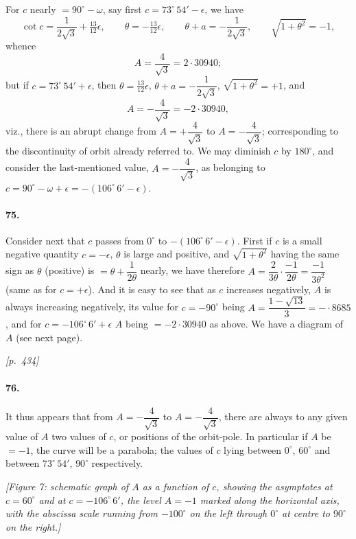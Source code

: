 \documentclass[11pt]{article}
\begin{document}
For $c$ nearly $= 90^{\circ}-\omega$, say first $c = 73^{\circ}\,54' - \epsilon$, we have
\[
\cot c = \dfrac{1}{2\sqrt{3}} + \tfrac{13}{12}\epsilon,\qquad \theta = -\tfrac{13}{12}\epsilon,\qquad \theta + a = -\dfrac{1}{2\sqrt{3}},\qquad \sqrt{1 + \theta^{2}} = -1,
\]
whence
\[
A = \dfrac{4}{\sqrt{3}} = 2{\cdot}30940;
\]
but if $c = 73^{\circ}\,54' + \epsilon$, then $\theta = \tfrac{13}{12}\epsilon$, $\theta + a = -\dfrac{1}{2\sqrt{3}}$, $\sqrt{1 + \theta^{2}} = +1$, and
\[
A = -\dfrac{4}{\sqrt{3}} = -2{\cdot}30940,
\]
viz., there is an abrupt change from $A = +\dfrac{4}{\sqrt{3}}$ to $A = -\dfrac{4}{\sqrt{3}}$; corresponding to the discontinuity of orbit already referred to. We may diminish $c$ by $180^{\circ}$, and consider the last-mentioned value, $A = -\dfrac{4}{\sqrt{3}}$, as belonging to $c = 90^{\circ} - \omega + \epsilon = -(106^{\circ}\,6' - \epsilon)$.

\paragraph{75.} Consider next that $c$ passes from $0^{\circ}$ to $-(106^{\circ}\,6' - \epsilon)$. First if $c$ is a small negative quantity $c = -\epsilon$, $\theta$ is large and positive, and $\sqrt{1 + \theta^{2}}$ having the same sign as $\theta$ (positive) is $=\theta + \dfrac{1}{2\theta}$ nearly, we have therefore $A = \dfrac{2}{3\theta}\cdot\dfrac{-1}{2\theta} = \dfrac{-1}{3\theta^{2}}$ (same as for $c = +\epsilon$). And it is easy to see that as $c$ increases negatively, $A$ is always increasing negatively, its value for $c = -90^{\circ}$ being $A = \dfrac{1 - \sqrt{13}}{3} = -{\cdot}8685$, and for $c = -106^{\circ}\,6' + \epsilon$ $A$ being $= -2{\cdot}30940$ as above. We have a diagram of $A$ (see next page).

\medskip
\noindent\textit{[p.~434]}

\medskip

\paragraph{76.} It thus appears that from $A = -\dfrac{4}{\sqrt{3}}$ to $A = -\dfrac{4}{\sqrt{3}}$, there are always to any given value of $A$ two values of $c$, or positions of the orbit-pole. In particular if $A$ be $= -1$, the curve will be a parabola; the values of $c$ lying between $0^{\circ},\, 60^{\circ}$ and between $73^{\circ}\,54',\, 90^{\circ}$ respectively.

\begin{center}
\textit{[Figure 7: schematic graph of $A$ as a function of $c$, showing the asymptotes at $c=60^{\circ}$ and at $c=-106^{\circ}\,6'$, the level $A=-1$ marked along the horizontal axis, with the abscissa scale running from $-100^{\circ}$ on the left through $0^{\circ}$ at centre to $90^{\circ}$ on the right.]}
\end{center}
\end{document}
